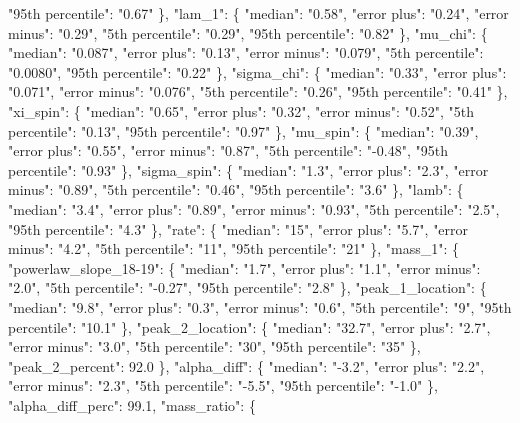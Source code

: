 {{        "95th percentile": "0.67"%
      \}, %
      "lam\_1": \{%
        "median": "0.58", %
        "error plus": "0.24", %
        "error minus": "0.29", %
        "5th percentile": "0.29", %
        "95th percentile": "0.82"%
      \}, %
      "mu\_chi": \{%
        "median": "0.087", %
        "error plus": "0.13", %
        "error minus": "0.079", %
        "5th percentile": "0.0080", %
        "95th percentile": "0.22"%
      \}, %
      "sigma\_chi": \{%
        "median": "0.33", %
        "error plus": "0.071", %
        "error minus": "0.076", %
        "5th percentile": "0.26", %
        "95th percentile": "0.41"%
      \}, %
      "xi\_spin": \{%
        "median": "0.65", %
        "error plus": "0.32", %
        "error minus": "0.52", %
        "5th percentile": "0.13", %
        "95th percentile": "0.97"%
      \}, %
      "mu\_spin": \{%
        "median": "0.39", %
        "error plus": "0.55", %
        "error minus": "0.87", %
        "5th percentile": "{-}0.48", %
        "95th percentile": "0.93"%
      \}, %
      "sigma\_spin": \{%
        "median": "1.3", %
        "error plus": "2.3", %
        "error minus": "0.89", %
        "5th percentile": "0.46", %
        "95th percentile": "3.6"%
      \}, %
      "lamb": \{%
        "median": "3.4", %
        "error plus": "0.89", %
        "error minus": "0.93", %
        "5th percentile": "2.5", %
        "95th percentile": "4.3"%
      \}, %
      "rate": \{%
        "median": "15", %
        "error plus": "5.7", %
        "error minus": "4.2", %
        "5th percentile": "11", %
        "95th percentile": "21"%
      \}, %
      "mass\_1": \{%
        "powerlaw\_slope\_18{-}19": \{%
          "median": "1.7", %
          "error plus": "1.1", %
          "error minus": "2.0", %
          "5th percentile": "{-}0.27", %
          "95th percentile": "2.8"%
        \}, %
        "peak\_1\_location": \{%
          "median": "9.8", %
          "error plus": "0.3", %
          "error minus": "0.6", %
          "5th percentile": "9", %
          "95th percentile": "10.1"%
        \}, %
        "peak\_2\_location": \{%
          "median": "32.7", %
          "error plus": "2.7", %
          "error minus": "3.0", %
          "5th percentile": "30", %
          "95th percentile": "35"%
        \}, %
        "peak\_2\_percent": 92.0%
      \}, %
      "alpha\_diff": \{%
        "median": "{-}3.2", %
        "error plus": "2.2", %
        "error minus": "2.3", %
        "5th percentile": "{-}5.5", %
        "95th percentile": "{-}1.0"%
      \}, %
      "alpha\_diff\_perc": 99.1, %
      "mass\_ratio": \{%
}}

